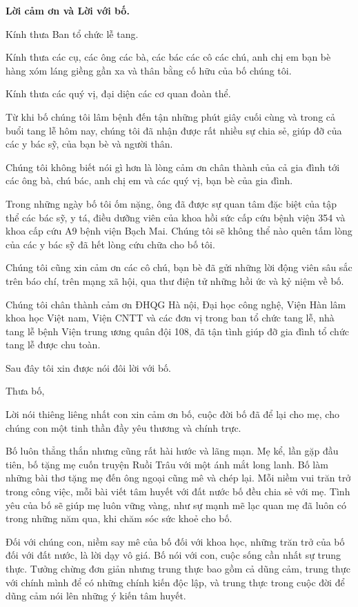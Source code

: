 \begin{center}
{\bf Lời cảm ơn và Lời với bố.}
\end{center}

Kính thưa Ban tổ chức lễ tang.

Kính thưa các cụ, các ông các bà, các bác các cô các chú, anh chị em bạn bè hàng xóm láng giềng gần xa và thân bằng cố hữu của bố chúng tôi.

Kính thưa các quý vị, đại diện các cơ quan đoàn thể.

Từ khi bố chúng tôi lâm bệnh đến tận những phút giây cuối cùng và trong cả buổi tang lễ hôm nay, chúng tôi đã nhận được rất nhiều sự chia sẻ, giúp đỡ của các y bác sỹ, của bạn bè và người thân.

Chúng tôi không biết nói gì hơn là lòng cảm ơn chân thành của cả gia đình tới các ông bà, chú bác, anh chị em và các quý vị, bạn bè của gia đình.

Trong những ngày bố tôi ốm nặng, ông đã được sự quan tâm đặc biệt của tập thể các bác sỹ, y tá, điều dưỡng viên của khoa hồi sức cấp cứu bệnh viện 354 và khoa cấp cứu A9 bệnh viện Bạch Mai. Chúng tôi sẽ không thể nào quên tấm lòng của các y bác sỹ đã hết lòng cứu chữa cho bố tôi.

Chúng tôi cũng xin cảm ơn các cô chú, bạn bè đã gửi những lời động viên sâu sắc trên báo chí, trên mạng xã hội, qua thư điện tử những hồi ức và kỷ niệm về bố.

Chúng tôi chân thành cảm ơn ĐHQG Hà nội, Đại học công nghệ, Viện Hàn lâm khoa học Việt nam, Viện CNTT và các đơn vị trong ban tổ chức tang lễ, nhà tang lễ bệnh Viện trung ương quân đội 108, đã tận tình giúp đỡ gia đình tổ chức tang lễ được chu toàn.


Sau đây tôi xin được nói đôi lời với bố.

Thưa bố,

Lời nói thiêng liêng nhất con xin cảm ơn bố, cuộc đời bố đã để lại cho mẹ, cho chúng con một tinh thần đầy yêu thương và chính trực.

Bố luôn thẳng thắn nhưng cũng rất hài hước và lãng mạn. Mẹ kể, lần gặp đầu tiên, bố tặng mẹ cuốn truyện Ruồi Trâu với một ánh mắt long lanh. Bố làm những bài thơ tặng mẹ đến ông ngoại cũng mê và chép lại. Mỗi niềm vui trăn trở trong công việc, mỗi bài viết tâm huyết với đất nước bố đều chia sẻ với mẹ. Tình yêu của bố sẽ giúp mẹ luôn vững vàng, như sự mạnh mẽ lạc quan mẹ đã luôn có trong những năm qua, khi chăm sóc sức khoẻ cho bố.

Đối với chúng con, niềm say mê của bố đối với khoa học, những trăn trở của bố đối với đất nước, là lời dạy vô giá. Bố nói với con, cuộc sống cần nhất sự trung thực. Tưởng chừng đơn giản nhưng trung thực bao gồm cả dũng cảm, trung thực với chính mình để có những chính kiến độc lập, và trung thực trong cuộc đời để dũng cảm nói lên những ý kiến tâm huyết.

